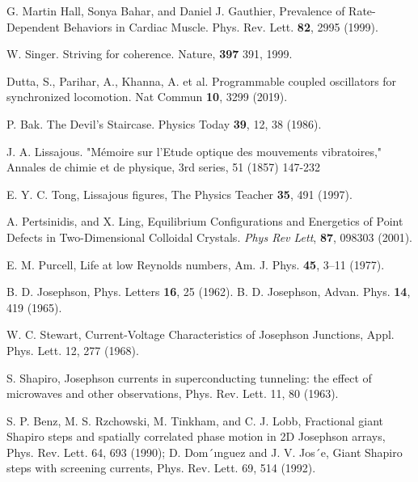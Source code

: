 \documentclass[twocolumn,preprintnumbers,amsmath,amssymb,aps,prx]{revtex4}
\begin{document}
\begin{thebibliography}{99}
   G. Martin Hall, Sonya Bahar, and Daniel J. Gauthier, Prevalence of Rate-Dependent Behaviors in Cardiac Muscle. Phys. Rev. Lett. {\bf 82}, 2995 (1999).

   W. Singer. Striving for coherence. Nature, {\bf 397} 391, 1999.

     Dutta, S., Parihar, A., Khanna, A. et al. Programmable coupled oscillators for synchronized locomotion. Nat Commun {\bf 10}, 3299 (2019).
    
     P. Bak. The Devil's Staircase. Physics Today {\bf 39}, 12, 38 (1986).

     J. A. Lissajous.  "Mémoire sur l'Etude optique des mouvements vibratoires,"  Annales de chimie et de physique, 3rd series, 51 (1857) 147-232

     E. Y. C. Tong, Lissajous figures, The Physics Teacher {\bf 35}, 491 (1997).

       A. Pertsinidis, and X. Ling,  Equilibrium Configurations and Energetics of Point Defects in Two-Dimensional Colloidal Crystals. {\it Phys Rev Lett}, {\bf 87}, 098303 (2001). %
      
     E. M. Purcell, Life at low Reynolds numbers, Am. J. Phys. {\bf 45}, 3–11 (1977).


     B. D. Josephson, Phys. Letters {\bf 16}, 25 (1962). 
     B. D. Josephson, Advan. Phys. {\bf 14}, 419 (1965).

      W. C. Stewart, Current-Voltage Characteristics of Josephson Junctions, Appl. Phys. Lett. 12, 277 (1968).
      
     S. Shapiro, Josephson currents in superconducting tunneling: the effect of microwaves and other observations, Phys. Rev. Lett. 11, 80 (1963).

      S. P. Benz, M. S. Rzchowski, M. Tinkham, and C. J. Lobb, Fractional giant Shapiro steps and spatially correlated phase motion in 2D Josephson arrays, Phys. Rev. Lett. 64, 693 (1990); D. Dom´ınguez and J. V. Jos´e, Giant Shapiro steps with screening currents, Phys. Rev. Lett. 69,
514 (1992).


\end{thebibliography}
\end{document}
